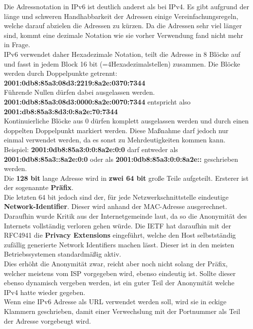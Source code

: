 \documentclass[12pt,a4paper]{report}
\begin{document}
Die Adressnotation in IPv6 ist deutlich anderst als bei IPv4. Es gibt aufgrund der länge und schweren Handhabbarkeit der Adressen einige Vereinfachungsregeln, welche darauf abzielen die Adressen zu kürzen. Da die Adressen sehr viel länger sind, kommt eine dezimale Notation wie sie vorher Verwendung fand nicht mehr in Frage.\\
IPv6 verwendet daher Hexadezimale Notation, teilt die Adresse in 8 Blöcke auf und fasst in jedem Block 16 bit (=4Hexadezimalstellen) zusammen. Die Blöcke werden durch Doppelpunkte getrennt: \textbf{2001:0db8:85a3:08d3:2219:8a2e:0370:7344}\\
Führende Nullen dürfen dabei ausgelassen werden. \textbf{2001:0db8:85a3:08d3:0000:8a2e:0070:7344} entspricht also \textbf{2001:db8:85a3:8d3:0:8a2e:70:7344}\\
Kontinuierliche Blöcke aus 0 dürfen komplett ausgelassen werden und durch einen doppelten Doppelpunkt markiert werden. Diese Maßnahme darf jedoch nur einmal verwendet werden, da es sonst zu Mehrdeutigkeiten kommen kann. Beispiel: \textbf{2001:0db8:85a3:0:0:8a2e:0:0} darf entweder als \textbf{2001:0db8:85a3::8a2e:0:0} oder als \textbf{2001:0db8:85a3:0:0:8a2e::} geschrieben werden.\\

Die \textbf{128 bit} lange Adresse wird in \textbf{zwei 64 bit} große Teile aufgeteilt. Ersterer ist der sogenannte \textbf{Präfix}.\\
Die letzten 64 bit jedoch sind der, für jede Netzwerkschnittstelle eindeutige \textbf{Network-Identifier}. Dieser wird anhand der MAC-Adresse ausgerechnet.\\
Daraufhin wurde Kritik aus der Internetgemeinde laut, da so die Anonymität des Internets vollständig verloren gehen würde. Die IETF hat daraufhin mit der RFC4941 die \textbf{Privacy Extensions} eingeführt, welche den Host selbstständig zufällig generierte Network Identifiers machen lässt. Dieser ist in den meisten Betriebssystemen standardmäßig aktiv.\\
Dies erhöht die Anonymität zwar, reicht aber noch nicht solang der Präfix, welcher meistens vom ISP vorgegeben wird, ebenso eindeutig ist. Sollte dieser ebenso dynamisch vergeben werden, ist ein guter Teil der Anonymität welche IPv4 hatte wieder gegeben.\\

Wenn eine IPv6 Adresse als URL verwendet werden soll, wird sie in eckige Klammern geschrieben, damit einer Verwechslung mit der Portnummer als Teil der Adresse vorgebeugt wird.\\
\end{document}
